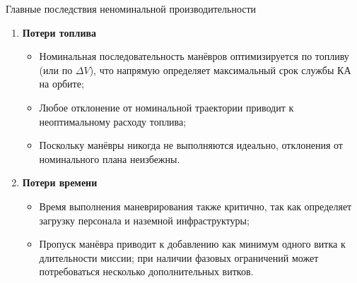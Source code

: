 \documentclass[8pt]{beamer}
\begin{document}
\begin{frame}{Главные последствия неноминальной производительности}
\begin{enumerate}
    \item \textbf{Потери топлива}
    \begin{itemize}
        \item Номинальная последовательность манёвров оптимизируется по топливу (или по $\Delta V$), что напрямую определяет максимальный срок службы КА на орбите;
        \item Любое отклонение от номинальной траектории приводит к неоптимальному расходу топлива;
        \item Поскольку манёвры никогда не выполняются идеально, отклонения от номинального плана неизбежны.
    \end{itemize}

    \item \textbf{Потери времени}
    \begin{itemize}
        \item Время выполнения маневрирования также критично, так как определяет загрузку персонала и наземной инфраструктуры;
        \item Пропуск манёвра приводит к добавлению как минимум одного витка к длительности миссии; при наличии фазовых ограничений может потребоваться несколько дополнительных витков.
    \end{itemize}
\end{enumerate}
\end{frame}
\end{document}
